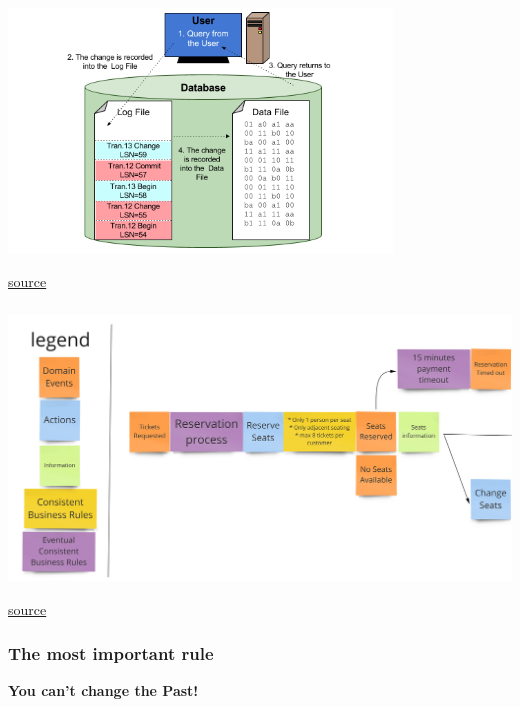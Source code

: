 \documentclass{beamer}
\newcommand{\source}[2]{
    \begin{flushright}
        \hfill {\scriptsize \href{#1}{#2}}
    \end{flushright}
}
\begin{document}

\begin{frame}

    \frametitle{\textbf{}}
    \includegraphics[height=65mm]{transaction_log.png}
    \source{https://sqlbak.com/academy/transaction-log}{source}
    
\end{frame}

\begin{frame}

    \frametitle{\textbf{}}
    \includegraphics[width=\textwidth]{eventstroming.jpg}
    \source{https://baasie.com/2018/10/22/eventstorming-and-how-to-monitor-domain-events-for-product-management/}{source}
    
\end{frame}



\begin{frame}

    \frametitle{\textbf{The most important rule}}

    \textbf{\Huge{You can't change the Past!}}

\end{frame}
\end{document}
